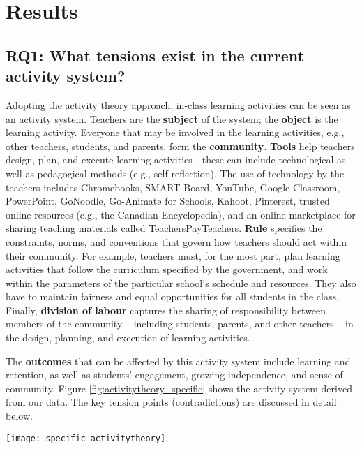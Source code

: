 \section{Results}
\label{sec:11}




\subsection{\textbf{RQ1: What tensions exist in the current activity system?}}
\label{sec:12}
Adopting the activity theory approach, in-class learning activities can be seen as an activity system.  Teachers are the {\bf subject} of the system; the {\bf object} is the learning activity.  Everyone that may be involved in the learning activities, e.g., other teachers, students, and parents, form the {\bf community}. {\bf Tools} help teachers design, plan, and execute learning activities---these can include technological as well as pedagogical methods (e.g., self-reflection). The use of technology by the teachers includes Chromebooks, SMART Board, YouTube, Google Classroom, PowerPoint, GoNoodle, Go-Animate for Schools, Kahoot, Pinterest, trusted online resources (e.g., the Canadian Encyclopedia), and an online marketplace for sharing teaching materials called TeachersPayTeachers.  {\bf Rule} specifies the constraints, norms, and conventions that govern how teachers should act within their community. For example, teachers must, for the most part, plan learning activities that follow the curriculum specified by the government, and work within the parameters of the particular school's schedule and resources. They also have to maintain fairness and equal opportunities for all students in the class.  Finally, {\bf division of labour} captures the sharing of responsibility between members of the community -- including students, parents, and other teachers -- in the design, planning, and execution of learning activities.  

The \textbf{outcomes} that can be affected by this activity system include learning and retention, as well as students' engagement, growing independence, and sense of community. Figure \ref{fig:activitytheory_specific} shows the activity system derived from our data. The key tension points (contradictions) are discussed in detail below.  

\begin{figure*}[ht!]
    \centering
    \texttt{[image: specific\_activitytheory]}
    \caption{Derived Activity System}
    \label{fig:activitytheory_specific}
\end{figure*}





